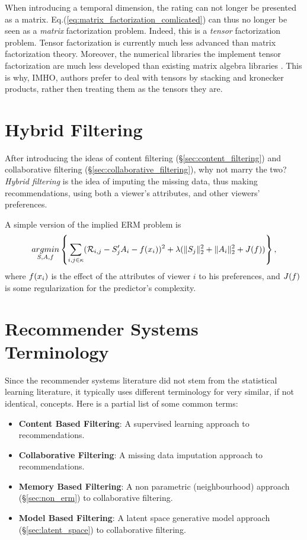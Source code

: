 \begin{remark}
When introducing a temporal dimension, the rating can not longer be presented as a matrix.
Eq.(\ref{eq:matrix_factorization_comlicated}) can thus no longer be seen as a \emph{matrix} factorization problem.
Indeed, this is a \emph{tensor} factorization problem.
Tensor factorization is currently much less advanced than matrix factorization theory. Moreover, the numerical libraries the implement tensor factorization are much less developed than existing matrix algebra libraries \citet{lorica_lets_????}.
This is why, IMHO, authors prefer to deal with tensors by stacking and kronecker products, rather then treating them as the tensors they are.
\end{remark}




\section{Hybrid Filtering}
After introducing the ideas of content filtering (\S\ref{sec:content_filtering}) and collaborative filtering (\S\ref{sec:collaborative_filtering}), why not marry the two?
\emph{Hybrid filtering} is the idea of imputing the missing data, thus making recommendations, using both a viewer's attributes, and other viewers' preferences.

A simple version of the implied ERM problem is 
\begin{align}
\label{eq:hybrid_filtering}
	\mathop{argmin} _{S,A, f}\left\{ \sum_{i,j \in \kappa} (\mathcal{R}_{i,j} - S_j' A_i - f(x_i) )^2 + \lambda (\Vert S_j \Vert_2^2 + \Vert A_i \Vert_2^2+ J(f))  \right\},
\end{align}
where $f(x_i)$ is the effect of the attributes of viewer $i$ to his preferences, and $J(f)$ is some regularization for the predictor's complexity.


\section{Recommender Systems Terminology}

Since the recommender systems literature did not stem from the statistical learning literature, it typically uses different terminology for very similar, if not identical, concepts.
Here is a partial list of some common terms:

\begin{itemize}
\item \textbf{Content Based Filtering}: A supervised learning approach to recommendations. 
\item \textbf{Collaborative Filtering}: A missing data imputation approach to recommendations.
\item \textbf{Memory Based Filtering}: A non parametric (neighbourhood) approach (\S\ref{sec:non_erm}) to collaborative filtering.
\item \textbf{Model Based Filtering}: A latent space generative model approach (\S\ref{sec:latent_space}) to collaborative filtering.
\end{itemize}



